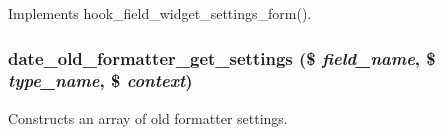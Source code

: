 \label{date_8field_8inc_aacfb6134f4d15984d676313004bc7939}
Implements hook\_\-field\_\-widget\_\-settings\_\-form(). \hypertarget{date_8field_8inc_a6e4aa76c83e765e2b7e3dfdcd0903479}{
\subsubsection[{date\_\-old\_\-formatter\_\-get\_\-settings}]{\setlength{\rightskip}{0pt plus 5cm}date\_\-old\_\-formatter\_\-get\_\-settings (\$ {\em field\_\-name}, \/  \$ {\em type\_\-name}, \/  \$ {\em context})}}
\label{date_8field_8inc_a6e4aa76c83e765e2b7e3dfdcd0903479}
Constructs an array of old formatter settings. 